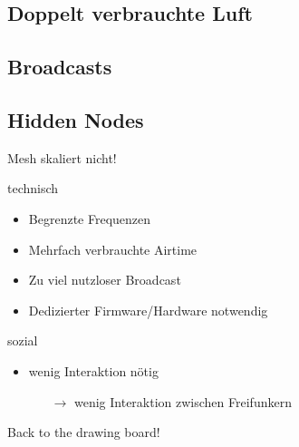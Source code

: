 \documentclass{beamer}
\begin{document}
	{
		
	}

	\subsection{Doppelt verbrauchte Luft}
	{
		
	}

	\subsection{Broadcasts}
	{
		
	}

	\subsection{Hidden Nodes}
	{
		
	}

	\begin{frame}{Mesh skaliert nicht!}
	\begin{block}{technisch}
		\begin{itemize}
			\item Begrenzte Frequenzen
			\item Mehrfach verbrauchte Airtime
			\item Zu viel nutzloser Broadcast
			\item Dedizierter Firmware/Hardware notwendig
		\end{itemize}

	\end{block}
	\begin{block}{sozial}
		\begin{itemize}
			\item wenig Interaktion nötig
			\begin{itemize}
			 \item[$\rightarrow$] wenig Interaktion zwischen Freifunkern
			\end{itemize}

		\end{itemize}
	\end{block}
	\end{frame}

	\begin{frame}[standout]
		Back to the drawing board!
	\end{frame}
\end{document}

